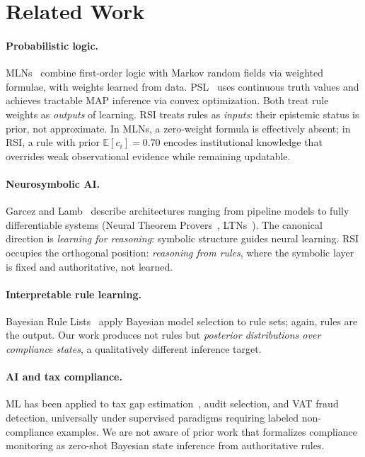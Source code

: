 \documentclass[letterpaper]{article}
\begin{document}
\section{Related Work}
\label{sec:related}

\paragraph{Probabilistic logic.}
MLNs~\citep{richardson2006markov} combine first-order logic with Markov
random fields via weighted formulae, with weights learned from data.
PSL~\citep{bach2017hinge} uses continuous truth values and achieves
tractable MAP inference via convex optimization. Both treat rule weights
as \emph{outputs} of learning. RSI treats rules as \emph{inputs}: their
epistemic status is prior, not approximate. In MLNs, a zero-weight
formula is effectively absent; in RSI, a rule with prior
$\mathbb{E}[c_i] = 0.70$ encodes institutional knowledge that overrides
weak observational evidence while remaining updatable.

\paragraph{Neurosymbolic AI.}
Garcez and Lamb~\citeyearpar{garcez2022neural} describe architectures
ranging from pipeline models to fully differentiable systems (Neural
Theorem Provers~\citep{rocktaschel2017end}, LTNs~\citep{badreddine2022logic}).
The canonical direction is \emph{learning for reasoning}: symbolic
structure guides neural learning. RSI occupies the orthogonal position:
\emph{reasoning from rules}, where the symbolic layer is fixed and
authoritative, not learned.

\paragraph{Interpretable rule learning.}
Bayesian Rule Lists~\citep{letham2015interpretable} apply Bayesian
model selection to rule sets; again, rules are the output. Our work
produces not rules but \emph{posterior distributions over compliance
states}, a qualitatively different inference target.

\paragraph{AI and tax compliance.}
ML has been applied to tax gap estimation~\citep{gomes2022machine},
audit selection, and VAT fraud detection, universally under supervised
paradigms requiring labeled non-compliance examples. We are not aware
of prior work that formalizes compliance monitoring as zero-shot
Bayesian state inference from authoritative rules.
\end{document}
